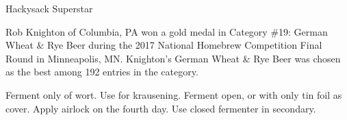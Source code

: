 \begin{recipe}{Hackysack Superstar}

\begin{aboutblock}
Rob Knighton of Columbia, PA won a gold medal in Category \#19: German Wheat \& Rye
Beer during the 2017 National Homebrew Competition Final Round in Minneapolis, MN.
Knighton's German Wheat \& Rye Beer was chosen as the best among 192 entries in
the category. \sourceaha
\end{aboutblock}


\begin{methodandtiming}
 
\begin{mashsteps}
\end{mashsteps}

\begin{fermentationsteps}
\end{fermentationsteps}

\begin{directions}
Ferment only  of wort. Use  for krausening. Ferment open, or
with only tin foil as cover. Apply airlock on the fourth day. Use closed fermenter
in secondary.
\end{directions}

\end{methodandtiming}

\recipebreak

\begin{ingredientsblock}

\begin{malts}
\end{malts}

\begin{hops}
\end{hops}


\begin{twists}
\end{twists}

\end{ingredientsblock}

\end{recipe}

